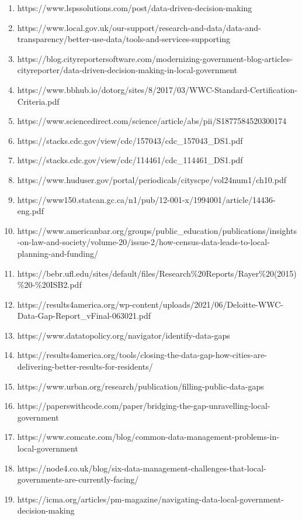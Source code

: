 \documentclass[
  letterpaper,
  DIV=11,
  numbers=noendperiod]{scrartcl}
\begin{document}
\begin{enumerate}
\item
  https://www.lspssolutions.com/post/data-driven-decision-making
\item
  https://www.local.gov.uk/our-support/research-and-data/data-and-transparency/better-use-data/tools-and-services-supporting
\item
  https://blog.cityreportersoftware.com/modernizing-government-blog-articles-cityreporter/data-driven-decision-making-in-local-government
\item
  https://www.bbhub.io/dotorg/sites/8/2017/03/WWC-Standard-Certification-Criteria.pdf
\item
  https://www.sciencedirect.com/science/article/abs/pii/S1877584520300174
\item
  https://stacks.cdc.gov/view/cdc/157043/cdc\_157043\_DS1.pdf
\item
  https://stacks.cdc.gov/view/cdc/114461/cdc\_114461\_DS1.pdf
\item
  https://www.huduser.gov/portal/periodicals/cityscpe/vol24num1/ch10.pdf
\item
  https://www150.statcan.gc.ca/n1/pub/12-001-x/1994001/article/14436-eng.pdf
\item
  https://www.americanbar.org/groups/public\_education/publications/insights-on-law-and-society/volume-20/issue-2/how-census-data-leads-to-local-planning-and-funding/
\item
  https://bebr.ufl.edu/sites/default/files/Research\%20Reports/Rayer\%20(2015)\%20-\%20ISB2.pdf
\item
  https://results4america.org/wp-content/uploads/2021/06/Deloitte-WWC-Data-Gap-Report\_vFinal-063021.pdf
\item
  https://www.datatopolicy.org/navigator/identify-data-gaps
\item
  https://results4america.org/tools/closing-the-data-gap-how-cities-are-delivering-better-results-for-residents/
\item
  https://www.urban.org/research/publication/filling-public-data-gaps
\item
  https://paperswithcode.com/paper/bridging-the-gap-unravelling-local-government
\item
  https://www.comcate.com/blog/common-data-management-problems-in-local-government
\item
  https://node4.co.uk/blog/six-data-management-challenges-that-local-governments-are-currently-facing/
\item
  https://icma.org/articles/pm-magazine/navigating-data-local-government-decision-making

\end{enumerate}
\end{document}
